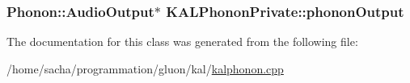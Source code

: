 \hypertarget{class_k_a_l_phonon_private_00ed2a3728bd58dbbfa1fac3eed1a222}{
\subsubsection[{phononOutput}]{\setlength{\rightskip}{0pt plus 5cm}Phonon::AudioOutput$\ast$ {\bf KALPhononPrivate::phononOutput}}}
\label{class_k_a_l_phonon_private_00ed2a3728bd58dbbfa1fac3eed1a222}




The documentation for this class was generated from the following file:\begin{CompactItemize}
\item 
/home/sacha/programmation/gluon/kal/\hyperlink{kalphonon_8cpp}{kalphonon.cpp}\end{CompactItemize}
